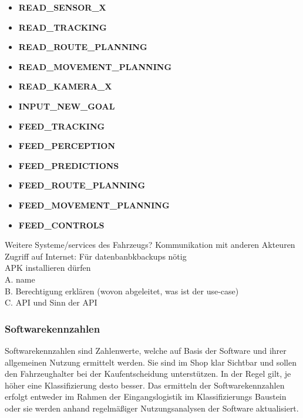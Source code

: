 \begin{itemize}
	\item[]\hspace{-0.6cm} \textbf{READ\_SENSOR\_X}
	\item[]\hspace{-0.6cm} \textbf{READ\_TRACKING}
	\item[]\hspace{-0.6cm} \textbf{READ\_ROUTE\_PLANNING}
	\item[]\hspace{-0.6cm} \textbf{READ\_MOVEMENT\_PLANNING}
	\item[]\hspace{-0.6cm} \textbf{READ\_KAMERA\_X}
	\item[]\hspace{-0.6cm} \textbf{INPUT\_NEW\_GOAL}
	\item[]\hspace{-0.6cm} \textbf{FEED\_TRACKING}
	\item[]\hspace{-0.6cm} \textbf{FEED\_PERCEPTION}
	\item[]\hspace{-0.6cm} \textbf{FEED\_PREDICTIONS}
	\item[]\hspace{-0.6cm} \textbf{FEED\_ROUTE\_PLANNING}
	\item[]\hspace{-0.6cm} \textbf{FEED\_MOVEMENT\_PLANNING}
	\item[]\hspace{-0.6cm} \textbf{FEED\_CONTROLS}
\end{itemize}
Weitere Systeme/services des Fahrzeugs?
Kommunikation mit anderen Akteuren\\
Zugriff auf Internet: Für datenbanbkbackups nötig\\
APK installieren dürfen\\

A. name\\
B. Berechtigung erklären (wovon abgeleitet, was ist der use-case)\\
C. API und Sinn der API\\

\subsubsection{Softwarekennzahlen}
Softwarekennzahlen sind Zahlenwerte, welche auf Basis der Software und ihrer allgemeinen Nutzung ermittelt werden. Sie sind im Shop klar Sichtbar und sollen den Fahrzeughalter bei der Kaufentscheidung unterstützen. In der Regel gilt, je höher eine Klassifizierung desto besser. Das ermitteln der Softwarekennzahlen erfolgt entweder im Rahmen der Eingangslogistik im Klassifizierungs Baustein oder sie werden anhand regelmäßiger Nutzungsanalysen der Software aktualisiert.

